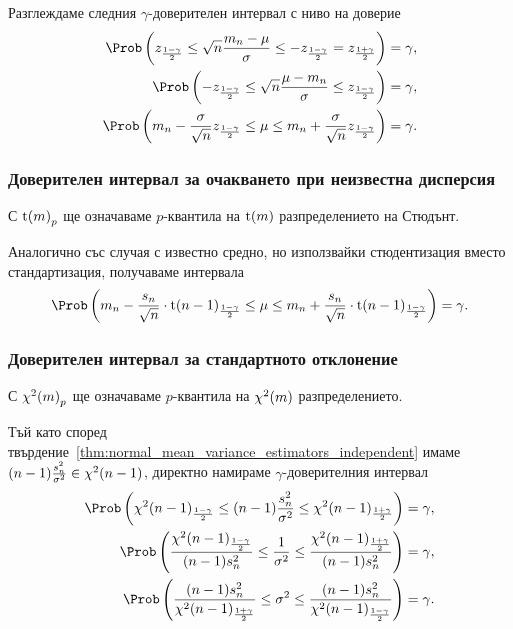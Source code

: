 \documentclass[numbers=endperiod, bibliography=totocnumbered]{scrartcl}
\begin{document}
Разглеждаме следния \( \gamma \)-доверителен интервал с ниво на доверие
\begin{align*}
  \Prob \left( z_{\frac {1-\gamma} 2} \leq \sqrt n \frac {m_n - \mu} \sigma \leq -z_{\frac {1-\gamma} 2} = z_{\frac {1+\gamma} 2} \right) &= \gamma,
  \\
  \Prob \left( -z_{\frac {1-\gamma} 2} \leq \sqrt n \frac {\mu - m_n} \sigma \leq z_{\frac {1-\gamma} 2} \right) &= \gamma,
  \\
  \Prob \left( m_n - \frac \sigma {\sqrt n} z_{\frac {1-\gamma} 2} \leq \mu \leq m_n + \frac \sigma {\sqrt n} z_{\frac {1-\gamma} 2} \right) &= \gamma.
\end{align*}

\subsubsection{Доверителен интервал за очакването при неизвестна дисперсия}

С \( {\operatorname{t}(m)}_p \) ще означаваме \( p \)-квантила на \( \operatorname{t}(m) \) разпределението на Стюдънт.

Аналогично със случая с известно средно, но използвайки стюдентизация вместо стандартизация, получаваме интервала
\begin{equation*}
  \Prob \left( m_n - \frac {s_n} {\sqrt n} \cdot {\DStudent(n-1)}_{\frac {1-\gamma} 2} \leq \mu \leq m_n + \frac {s_n} {\sqrt n} \cdot {\DStudent(n-1)}_{\frac {1-\gamma} 2} \right) = \gamma.
\end{equation*}

\subsubsection{Доверителен интервал за стандартното отклонение}

С \( {\chi^2(m)}_p \) ще означаваме \( p \)-квантила на \( \chi^2(m) \) разпределението.

Тъй като според твърдение~\ref{thm:normal_mean_variance_estimators_independent} имаме \( (n-1) \frac {s_n^2} {\sigma^2} \in \chi^2(n-1) \), директно намираме \( \gamma \)-доверителния интервал
\begin{align*}
  \Prob \left( {\DChiSq(n-1)}_{\frac {1-\gamma} 2} \leq (n-1) \frac {s_n^2} {\sigma^2} \leq {\DChiSq(n-1)}_{\frac {1+\gamma} 2} \right) &= \gamma,
  \\
  \Prob \left( \frac {{\DChiSq(n-1)}_{\frac {1-\gamma} 2}} {(n-1) s_n^2} \leq \frac 1 {\sigma^2} \leq \frac {{\DChiSq(n-1)}_{\frac {1+\gamma} 2}} {(n-1) s_n^2} \right) &= \gamma,
  \\
  \Prob \left( \frac {(n-1) s_n^2} {{\DChiSq(n-1)}_{\frac {1+\gamma} 2}} \leq \sigma^2 \leq \frac {(n-1) s_n^2} {{\DChiSq(n-1)}_{\frac {1-\gamma} 2}} \right) &= \gamma.
\end{align*}

\printbibliography
\end{document}
